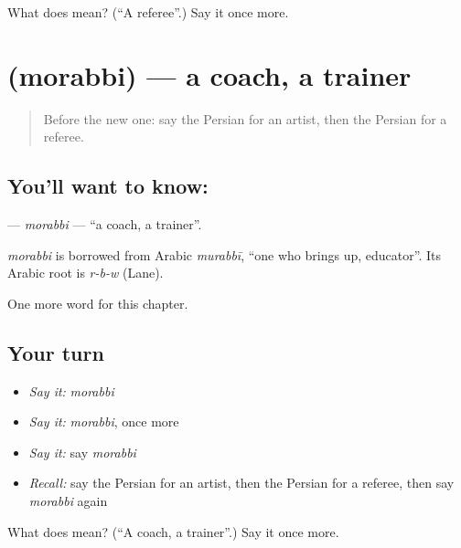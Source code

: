 \begin{tcolorbox}[breakable,colback=teal!4,colframe=teal!35!black,title={Before you move on}]
What does  mean? (\textquotedblleft{}A referee\textquotedblright{}.) Say it once more.
\end{tcolorbox}
\section[\texorpdfstring{\fa{مربی} (morabbi)}{مربی (morabbi)}]{ (morabbi) — a coach, a trainer}

\label{lesson:FA-C251-morabbi}



\begin{quote}
Before the new one: say the Persian for an artist, then the Persian for a referee.
\end{quote}

\subsection*{You'll want to know: }
\textbf{} — \emph{morabbi} — \textquotedblleft{}a coach, a trainer\textquotedblright{}.

\begin{cousinweb}
\emph{morabbi} is borrowed from Arabic \emph{murabbī}, \textquotedblleft{}one who brings up, educator\textquotedblright{}. Its Arabic root is \emph{r-b-w} (Lane).
\end{cousinweb}

\begin{grammarlens}[title={What you've built}]
One more word for this chapter.
\end{grammarlens}

\subsection*{Your turn}
\begin{itemize}
\raggedright
  \item \emph{Say it:} \emph{morabbi}
  \item \emph{Say it:} \emph{morabbi}, once more
  \item \emph{Say it:} say \emph{morabbi}
  \item \emph{Recall:} say the Persian for an artist, then the Persian for a referee, then say \emph{morabbi} again
\end{itemize}

\begin{tcolorbox}[breakable,colback=teal!4,colframe=teal!35!black,title={Before you move on}]
What does  mean? (\textquotedblleft{}A coach, a trainer\textquotedblright{}.) Say it once more.
\end{tcolorbox}
